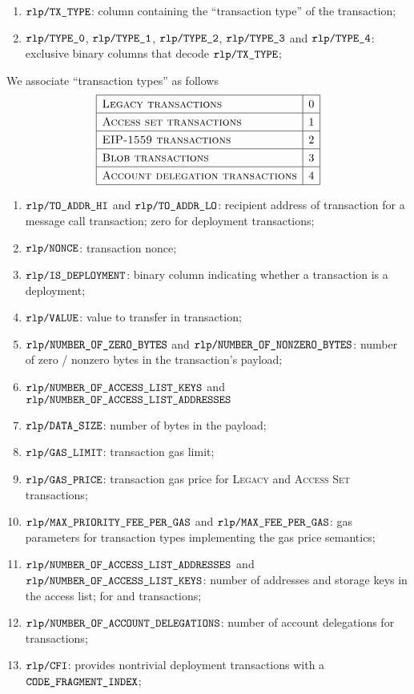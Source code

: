 \begin{enumerate}
	\item
		$\texttt{rlp} \texttt{/}{\texttt{TX\_TYPE}}$:
		column containing the ``transaction type'' of the transaction;
	\item 
		$\texttt{rlp} \texttt{/}{\texttt{\texttt{TYPE\_0}}}            $,
		$\texttt{rlp} \texttt{/}{\texttt{\texttt{TYPE\_1}}}         $,
		$\texttt{rlp} \texttt{/}{\texttt{\texttt{TYPE\_2}}}           $,
		$\texttt{rlp} \texttt{/}{\texttt{\texttt{TYPE\_3}}}              $ and
		$\texttt{rlp} \texttt{/}{\texttt{\texttt{TYPE\_4}}} $:
		exclusive binary columns that decode
		$\texttt{rlp} \texttt{/}{\texttt{TX\_TYPE}}$;
\end{enumerate}
We associate ``transaction types'' as follows
\[
	\renewcommand{\arraystretch}{1.3}
	\begin{array}{|l|c|}
		\hline
		\textsc{Legacy transactions}             & 0 \\ \hline
		\textsc{Access set transactions}         & 1 \\ \hline
		\textsc{EIP-1559 transactions}           & 2 \\ \hline
		\textsc{Blob transactions}               & 3 \\ \hline
		\textsc{Account delegation transactions} & 4 \\ \hline
	\end{array}
\]
\begin{enumerate}[resume]
	\item
		$\texttt{rlp} \texttt{/}{\texttt{TO\_ADDR\_HI}}$ and
		$\texttt{rlp} \texttt{/}{\texttt{TO\_ADDR\_LO}}$:
		recipient address of transaction for a message call transaction;
		zero for deployment transactions;
	\item
		$\texttt{rlp} \texttt{/}{\texttt{NONCE}}$:
		transaction nonce;
	\item
		$\texttt{rlp} \texttt{/}{\texttt{IS\_DEPLOYMENT}}$:
		binary column indicating whether a transaction is a deployment;
	\item
		$\texttt{rlp} \texttt{/}{\texttt{VALUE}}$:
		value to transfer in transaction;
	\item
		$\texttt{rlp} \texttt{/}{\texttt{NUMBER\_OF\_ZERO\_BYTES}}$ and
		$\texttt{rlp} \texttt{/}{\texttt{NUMBER\_OF\_NONZERO\_BYTES}}$:
		number of zero / nonzero bytes in the transaction's payload;
	\item
		$\texttt{rlp} \texttt{/}{\texttt{NUMBER\_OF\_ACCESS\_LIST\_KEYS}}$ and
		$\texttt{rlp} \texttt{/}{\texttt{NUMBER\_OF\_ACCESS\_LIST\_ADDRESSES}}$
	\item
		$\texttt{rlp} \texttt{/}{\texttt{DATA\_SIZE}}$:
		number of bytes in the payload;
	\item
		$\texttt{rlp} \texttt{/}{\texttt{GAS\_LIMIT}}$:
		transaction gas limit;
	\item
		$\texttt{rlp} \texttt{/}{\texttt{GAS\_PRICE}}$:
		transaction gas price for
		\textsc{Legacy} and
		\textsc{Access Set} transactions;
	\item
		$\texttt{rlp} \texttt{/}{\texttt{MAX\_PRIORITY\_FEE\_PER\_GAS}} $ and
		$\texttt{rlp} \texttt{/}{\texttt{MAX\_FEE\_PER\_GAS}}         $:
		gas parameters for transaction types implementing the
		\cite{EIP-1559} gas price semantics;
	\item
		$\texttt{rlp} \texttt{/}{\texttt{NUMBER\_OF\_ACCESS\_LIST\_ADDRESSES}}$ and
		$\texttt{rlp} \texttt{/}{\texttt{NUMBER\_OF\_ACCESS\_LIST\_KEYS}}$:
		number of addresses and storage keys in the access list;
		for \cite{EIP-2929} and \cite{EIP-2930} transactions;
	\item
		$\texttt{rlp} \texttt{/}{\texttt{NUMBER\_OF\_ACCOUNT\_DELEGATIONS}}$:
		number of account delegations
		for \cite{EIP-7702} transactions;
	\item
		$\texttt{rlp} \texttt{/}{\texttt{\texttt{CFI}}}$:
		provides nontrivial deployment transactions with a $\texttt{CODE\_FRAGMENT\_INDEX}$;
\end{enumerate}

